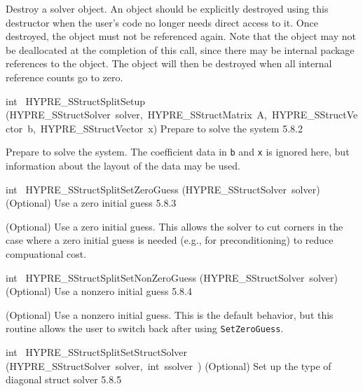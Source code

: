 \documentclass{article}
\begin{document}
\begin{cxxentry}
\begin{cxxentry}
\begin{cxxfunction}
\begin{cxxdoc}
Destroy a solver object.  An object should be explicitly destroyed
using this destructor when the user's code no longer needs direct
access to it.  Once destroyed, the object must not be referenced
again.  Note that the object may not be deallocated at the
completion of this call, since there may be internal package
references to the object.  The object will then be destroyed when
all internal reference counts go to zero.
\end{cxxdoc}
\end{cxxfunction}
\begin{cxxfunction}
{int\ }
        {HYPRE\_SStructSplitSetup}
        {(HYPRE\_SStructSolver\ solver,\ HYPRE\_SStructMatrix\ A,\ HYPRE\_SStructVector\ b,\ HYPRE\_SStructVector\ x)}
        {
Prepare to solve the system}
        {5.8.2}
\begin{cxxdoc}

Prepare to solve the system.  The coefficient data in {\tt b} and {\tt x} is
ignored here, but information about the layout of the data may be used.
\end{cxxdoc}
\end{cxxfunction}
\begin{cxxfunction}
{int\ }
        {HYPRE\_SStructSplitSetZeroGuess}
        {(HYPRE\_SStructSolver\ solver)}
        {
(Optional) Use a zero initial guess}
        {5.8.3}
\begin{cxxdoc}

(Optional) Use a zero initial guess.  This allows the solver to cut corners
in the case where a zero initial guess is needed (e.g., for preconditioning)
to reduce compuational cost.
\end{cxxdoc}
\end{cxxfunction}
\begin{cxxfunction}
{int\ }
        {HYPRE\_SStructSplitSetNonZeroGuess}
        {(HYPRE\_SStructSolver\ solver)}
        {
(Optional) Use a nonzero initial guess}
        {5.8.4}
\begin{cxxdoc}

(Optional) Use a nonzero initial guess.  This is the default behavior, but
this routine allows the user to switch back after using {\tt SetZeroGuess}.
\end{cxxdoc}
\end{cxxfunction}
\begin{cxxfunction}
{int\ }
        {HYPRE\_SStructSplitSetStructSolver}
        {(HYPRE\_SStructSolver\ solver,\ int\ ssolver\ )}
        {
(Optional) Set up the type of diagonal struct solver}
        {5.8.5}
\begin{cxxdoc}


\end{cxxdoc}
\end{cxxfunction}
\end{cxxentry}
\end{cxxentry}
\end{document}
